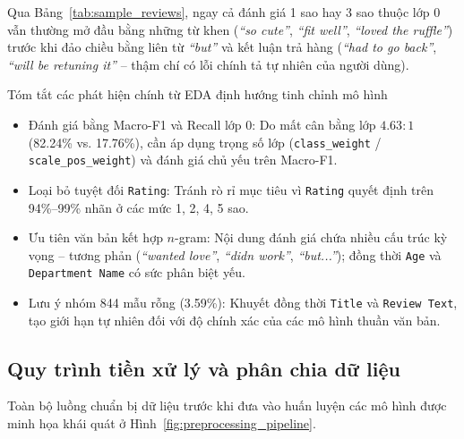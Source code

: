 Qua Bảng~\ref{tab:sample_reviews}, ngay cả đánh giá 1 sao hay 3 sao thuộc lớp 0 vẫn thường mở đầu bằng những từ khen (\textit{``so cute''}, \textit{``fit well''}, \textit{``loved the ruffle''}) trước khi đảo chiều bằng liên từ \textit{``but''} và kết luận trả hàng (\textit{``had to go back''}, \textit{``will be retuning it''} -- thậm chí có lỗi chính tả tự nhiên của người dùng).

\begin{Qbox}{Tóm tắt các phát hiện chính từ EDA định hướng tinh chỉnh mô hình}
\begin{itemize}
    \item Đánh giá bằng Macro-F1 và Recall lớp 0: Do mất cân bằng lớp $4.63:1$ (82.24\% vs. 17.76\%), cần áp dụng trọng số lớp (\texttt{class\_weight} / \texttt{scale\_pos\_weight}) và đánh giá chủ yếu trên Macro-F1.
    \item Loại bỏ tuyệt đối \texttt{Rating}: Tránh rò rỉ mục tiêu vì \texttt{Rating} quyết định trên 94\%--99\% nhãn ở các mức 1, 2, 4, 5 sao.
    \item Ưu tiên văn bản kết hợp $n$-gram: Nội dung đánh giá chứa nhiều cấu trúc kỳ vọng -- tương phản (\textit{``wanted love''}, \textit{``didn work''}, \textit{``but...''}); đồng thời \texttt{Age} và \texttt{Department Name} có sức phân biệt yếu.
    \item Lưu ý nhóm 844 mẫu rỗng (3.59\%): Khuyết đồng thời \texttt{Title} và \texttt{Review Text}, tạo giới hạn tự nhiên đối với độ chính xác của các mô hình thuần văn bản.
\end{itemize}
\end{Qbox}

\subsection{Quy trình tiền xử lý và phân chia dữ liệu}
Toàn bộ luồng chuẩn bị dữ liệu trước khi đưa vào huấn luyện các mô hình được minh họa khái quát ở Hình~\ref{fig:preprocessing_pipeline}.

